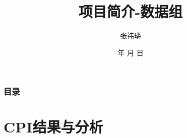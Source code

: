 \documentclass{beamer}
\begin{document}
\title{项目简介-数据组}

\author{张祎璘}


\renewcommand{\today}{\number\year 年 \number\month 月 \number\day 日}
\date{\today}

\subject{Presentations}

\begin{frame}
\titlepage
\end{frame}

\begin{frame}
\frametitle{目录}
\tableofcontents%
\end{frame}

\section{CPI结果与分析}
\end{document}
